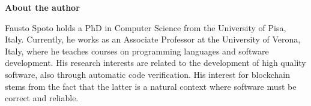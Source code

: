 \newpage

\pagestyle{empty}

\nbvspace[1]
\normalsize

\textbf{About the author}

Fausto Spoto holds a PhD in Computer Science from the University of Pisa, Italy.
Currently, he works as an Associate Professor at the University of Verona, Italy, where
he teaches courses on programming languages and software development.
His research interests are related to the development of high quality software,
also through automatic code verification. His interest for blockchain stems
from the fact that the latter is a natural context where
software must be correct and reliable.

\nbvspace[2]
